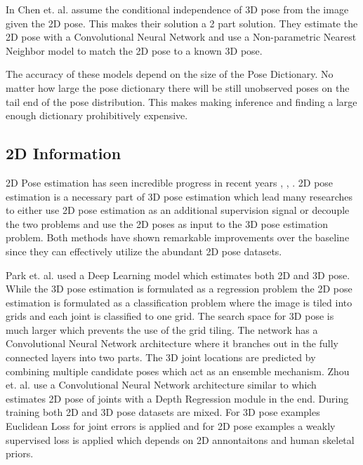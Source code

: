 In \parencite{chen20173d} Chen et. al. assume the conditional independence of 3D pose from the image given the 2D pose. This makes their solution a 2 part solution. They estimate the 2D pose with a Convolutional Neural Network and use a Non-parametric Nearest Neighbor model to match the 2D pose to a known 3D pose. 

The accuracy of these models depend on the size of the Pose Dictionary. No matter how large the pose dictionary there will be still unobserved poses on the tail end of the pose distribution. This makes making inference and finding a large enough dictionary prohibitively expensive.

\subsection{2D Information}

2D Pose estimation has seen incredible progress in recent years \parencite{cao2016realtime}, \parencite{newell2016stacked}, \parencite{iqbal2017posetrack}. 2D pose estimation is a necessary part of 3D pose estimation which lead many researches to either use 2D pose estimation as an additional supervision signal or decouple the two problems and use the 2D poses as input to the 3D pose estimation problem. Both methods have shown remarkable improvements over the baseline since they can effectively utilize the abundant 2D pose datasets. 

Park et. al. \parencite{park20163d} used a Deep Learning model which estimates both 2D and 3D pose. While the 3D pose estimation is formulated as a regression problem the 2D pose estimation is formulated as a classification problem where the image is tiled into grids and each joint is classified to one grid. The search space for 3D pose is much larger which prevents the use of the grid tiling. The network has a Convolutional Neural Network architecture where it branches out in the fully connected layers into two parts. The 3D joint locations are predicted by combining multiple candidate poses which act as an ensemble mechanism. Zhou et. al. \parencite{zhou2017towards} use a Convolutional Neural Network architecture  similar to \parencite{newell2016stacked} which estimates 2D pose of joints with a Depth Regression module in the end. During training both 2D and 3D pose datasets are mixed. For 3D pose examples Euclidean Loss for joint errors is applied and for 2D pose examples a weakly supervised loss is applied which depends on 2D annontaitons and human skeletal priors.     

